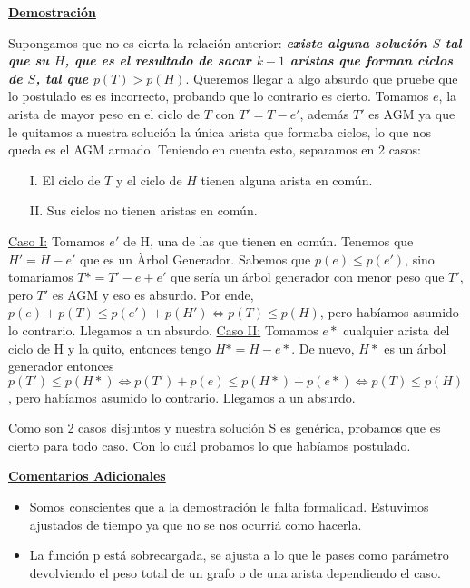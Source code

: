 \noindent\textbf{\underline{Demostración}}

Supongamos que no es cierta la relación anterior:\textbf{\textit{ existe alguna solución \boldmath$S$ tal que su \boldmath$H$, que es el resultado de sacar \boldmath$k-1$ aristas que forman ciclos de \boldmath$S$, tal que \boldmath$p(T) > p(H)$}}. Queremos llegar a algo absurdo que pruebe que lo postulado es es incorrecto, probando que lo contrario es cierto.
Tomamos $e$, la arista de mayor peso en el ciclo de $T$ con $T' = T - e'$, además $T'$ es AGM ya que le quitamos a nuestra solución la única arista que formaba ciclos, lo que nos queda es el AGM armado. Teniendo en cuenta esto, separamos en 2 casos:
\begin{enumerate}
\item[I.] El ciclo de $T$ y el ciclo de $H$ tienen alguna arista en común.
\item[II.] Sus ciclos no tienen aristas en común.
\end{enumerate}

\underline{Caso I:} Tomamos $e'$ de H, una de las que tienen en común. Tenemos que $H' = H - e'$ que es un Àrbol Generador. Sabemos que $p(e) \leq p(e')$, sino tomaríamos $T* = T' - e + e'$ que sería un árbol generador con menor peso que $T'$, pero $T'$ es AGM y eso es absurdo. Por ende, $p(e) + p(T) \leq p(e') + p(H') \iff p(T) \leq p(H)$, pero habíamos asumido lo contrario. Llegamos a un absurdo.  \newline
\indent \underline{Caso II:} Tomamos $e*$ cualquier arista del ciclo de H y la quito, entonces tengo $H* = H - e*$. De nuevo, $H*$ es un árbol generador entonces $p(T') \leq p(H*) \iff p(T') + p(e) \leq p(H*) + p(e*) \iff p(T) \leq p(H)$, pero habíamos asumido lo contrario. Llegamos a un absurdo.

Como son 2 casos disjuntos y nuestra solución S es genérica, probamos que es cierto para todo caso. Con lo cuál probamos lo que habíamos postulado.

\noindent\textbf{\underline{Comentarios Adicionales}}

\begin{itemize}
\item Somos conscientes que a la demostración le falta formalidad. Estuvimos ajustados de tiempo ya que no se nos ocurriá como hacerla.
\item La función p está sobrecargada, se ajusta a lo que le pases como parámetro devolviendo el peso total de un grafo o de una arista dependiendo el caso.
\end{itemize}

